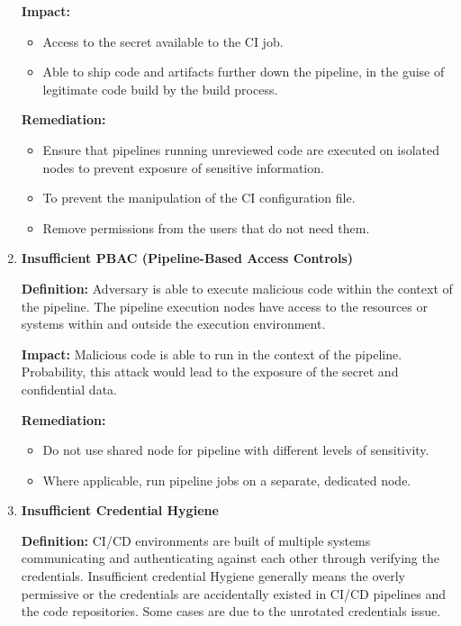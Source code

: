 \begin{enumerate}[label=(\arabic*)]
    \textbf{Impact: }
        \begin{itemize}
            \item Access to the secret available to the CI job.
            \item Able to ship code and artifacts further down the pipeline, in the guise of legitimate 
            code build by the build process.
        \end{itemize}

    \textbf{Remediation:}
        \begin{itemize}
            \item Ensure that pipelines running unreviewed code are executed on isolated nodes to prevent
            exposure of sensitive information.
            \item To prevent the manipulation of the CI configuration file.
            \item Remove permissions from the users that do not need them.
        \end{itemize}
    \item \textbf{Insufficient PBAC (Pipeline-Based Access Controls)}

    \textbf{Definition: }
        Adversary is able to execute malicious code within the context of the pipeline.
        The pipeline execution nodes have access to the resources or systems within and outside the 
        execution environment.

    \textbf{Impact: }
        Malicious code is able to run in the context of the pipeline. Probability, this attack would lead to 
        the exposure of the secret and confidential data.
        
    \textbf{Remediation:}
        \begin{itemize}
            \item Do not use shared node for pipeline with different levels of sensitivity.
            \item Where applicable, run pipeline jobs on a separate, dedicated node.
        \end{itemize}
    \item \textbf{Insufficient Credential Hygiene}

    \textbf{Definition: }
        CI/CD environments are built of multiple systems communicating and authenticating against each other
        through verifying the credentials. Insufficient credential Hygiene generally means the overly permissive
        or the credentials are accidentally existed in CI/CD pipelines and the code repositories. Some cases are
        due to the unrotated credentials issue.  


\end{enumerate}

